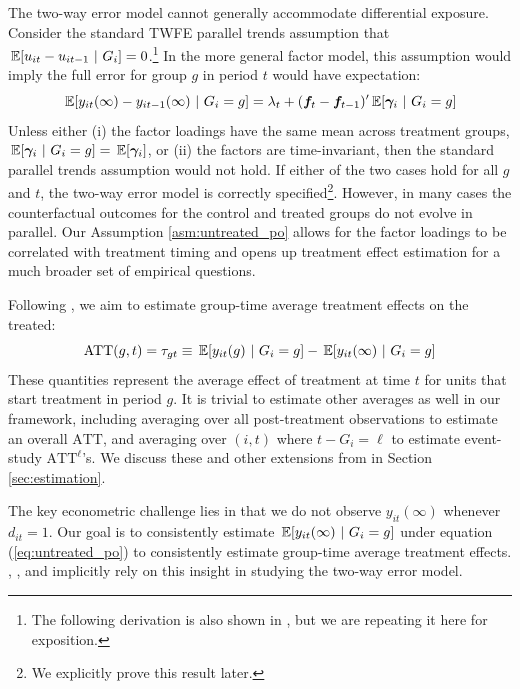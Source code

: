 \documentclass[12pt]{article}
\def\ATT{\text{ATT}}
\begin{document}
The two-way error model cannot generally accommodate differential exposure. Consider the standard TWFE parallel trends assumption that $\expec{u_{it} - u_{it-1}}{G_i} = 0$.\footnote{The following derivation is also shown in \citet{Callaway_Karami_2020}, but we are repeating it here for exposition.} In the more general factor model, this assumption would imply the full error for group $g$ in period $t$ would have expectation:
\begin{equation*}
  \expec{y_{it}(\infty) - y_{it-1}(\infty)}{G_i = g} = \lambda_t + (\bm f_t - \bm f_{t-1})' \expec{\bm \gamma_i}{G_i = g}
\end{equation*}
Unless either (i) the factor loadings have the same mean across treatment groups, $\expec{\bm \gamma_i}{G_i = g} = \expec{\bm \gamma_i}$, or (ii) the factors are time-invariant, then the standard parallel trends assumption would not hold. If either of the two cases hold for all $g$ and $t$, the two-way error model is correctly specified\footnote{We explicitly prove this result later.}. However, in many cases the counterfactual outcomes for the control and treated groups do not evolve in parallel. Our Assumption \ref{asm:untreated_po} allows for the factor loadings to be correlated with treatment timing and opens up treatment effect estimation for a much broader set of empirical questions.

Following \citet{Callaway_Santanna_2021}, we aim to estimate group-time average treatment effects on the treated:
\begin{equation}
  \ATT(g,t) = \tau_{gt} \equiv \expec{y_{it}(g)}{G_i = g} - \expec{y_{it}(\infty)}{G_i = g}
\end{equation}
These quantities represent the average effect of treatment at time $t$ for units that start treatment in period $g$. It is trivial to estimate other averages as well in our framework, including averaging over all post-treatment observations to estimate an overall $\ATT$, and averaging over $(i,t)$ where $t - G_i = \ell$ to estimate event-study $\ATT^\ell$'s. We discuss these and other extensions from \citet{Callaway_Santanna_2021} in Section \ref{sec:estimation}.

The key econometric challenge lies in that we do not observe $y_{it}(\infty)$ whenever $d_{it} = 1$. Our goal is to consistently estimate $\expec{y_{it}(\infty)}{G_i = g}$ under equation (\ref{eq:untreated_po}) to consistently estimate group-time average treatment effects. \citet{Gardner_2021}, \citet{Wooldridge_2021}, and \citet{Borusyak_Jaravel_Spiess_2021} implicitly rely on this insight in studying the two-way error model. 
\end{document}
